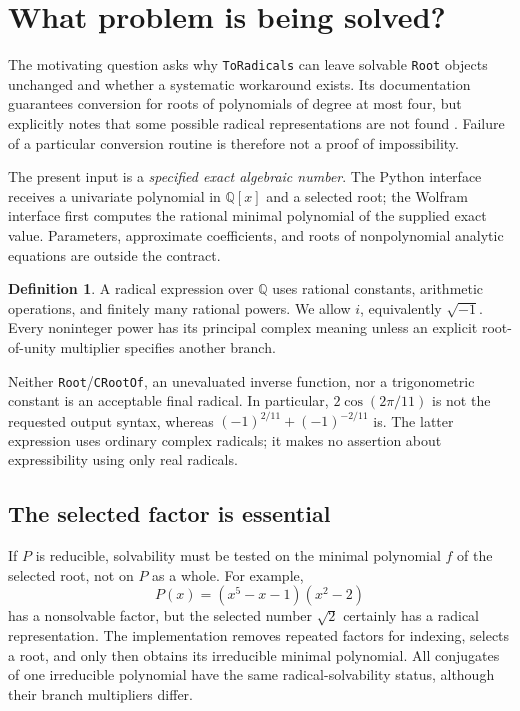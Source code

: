 \documentclass[11pt,a4paper]{article}
\theoremstyle{definition}\newtheorem{definition}[theorem]{Definition}
\theoremstyle{remark}\newtheorem{remark}[theorem]{Remark}
\newcommand{\Q}{\mathbb Q}\newcommand{\C}{\mathbb C}
\newcommand{\code}[1]{\texttt{#1}}
\begin{document}
\section{What problem is being solved?}
The motivating question \cite{question} asks why \code{ToRadicals} can leave
solvable \code{Root} objects unchanged and whether a systematic workaround
exists. Its documentation guarantees conversion for roots of polynomials of
degree at most four, but explicitly notes that some possible radical
representations are not found \cite{toradicals}. Failure of a particular
conversion routine is therefore not a proof of impossibility.

The present input is a \emph{specified exact algebraic number}. The Python
interface receives a univariate polynomial in $\Q[x]$ and a selected root; the
Wolfram interface first computes the rational minimal polynomial of the
supplied exact value. Parameters, approximate coefficients, and roots of
nonpolynomial analytic equations are outside the contract.

\begin{definition}
A radical expression over $\Q$ uses rational constants, arithmetic operations,
and finitely many rational powers. We allow $i$, equivalently $\sqrt{-1}$.
Every noninteger power has its principal complex meaning unless an explicit
root-of-unity multiplier specifies another branch.
\end{definition}
Neither \code{Root}/\code{CRootOf}, an unevaluated inverse function, nor a
trigonometric constant is an acceptable final radical. In particular,
$2\cos(2\pi/11)$ is not the requested output syntax, whereas
$(-1)^{2/11}+(-1)^{-2/11}$ is. The latter expression uses ordinary complex
radicals; it makes no assertion about expressibility using only real radicals.

\subsection{The selected factor is essential}
If $P$ is reducible, solvability must be tested on the minimal polynomial
$f$ of the selected root, not on $P$ as a whole. For example,
\[
 P(x)=(x^5-x-1)(x^2-2)
\]
has a nonsolvable factor, but the selected number $\sqrt2$ certainly has a
radical representation. The implementation removes repeated factors for
indexing, selects a root, and only then obtains its irreducible minimal
polynomial. All conjugates of one irreducible polynomial have the same
radical-solvability status, although their branch multipliers differ.
\end{document}
